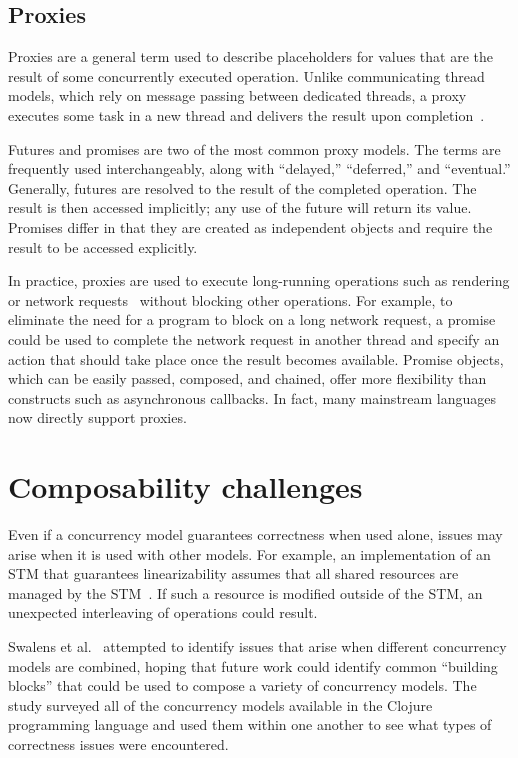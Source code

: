 \documentclass{sig-alternate}
\begin{document}
\subsection{Proxies}

Proxies are a general term used to describe placeholders for values that are the result of some concurrently executed operation. Unlike communicating thread models, which rely on message passing between dedicated threads, a proxy executes some task in a new thread and delivers the result upon completion~\cite{Swalens2014}.

Futures and promises are two of the most common proxy models. The terms are frequently used interchangeably, along with ``delayed,'' ``deferred,'' and ``eventual.'' Generally, futures are resolved to the result of the completed operation. The result is then accessed implicitly; any use of the future will return its value. Promises differ in that they are created as independent objects and require the result to be accessed explicitly.

In practice, proxies are used to execute long-running operations such as rendering or network requests~\cite{Swalens2014} without blocking other operations. For example, to eliminate the need for a program to block on a long network request, a promise could be used to complete the network request in another thread and specify an action that should take place once the result becomes available. Promise objects, which can be easily passed, composed, and chained, offer more flexibility than constructs such as asynchronous callbacks. In fact, many mainstream languages now directly support proxies.

\section{Composability challenges}

Even if a concurrency model guarantees correctness when used alone, issues may arise when it is used with other models. For example, an implementation of an STM that guarantees linearizability assumes that all shared resources are managed by the STM~\cite{Shavit1995}. If such a resource is modified outside of the STM, an unexpected interleaving of operations could result.

Swalens et al.~\cite{Swalens2014} attempted to identify issues that arise when different concurrency models are combined, hoping that future work could identify common ``building blocks'' that could be used to compose a variety of concurrency models. The study surveyed all of the concurrency models available in the Clojure programming language and used them within one another to see what types of correctness issues were encountered.
\end{document}
